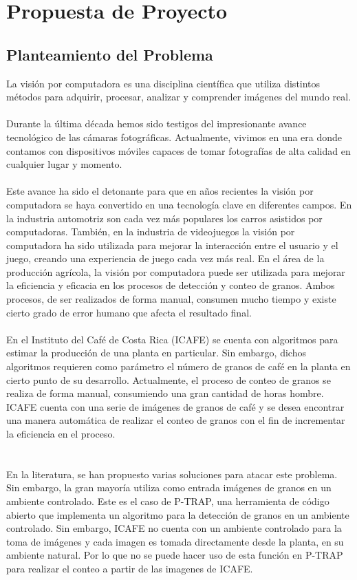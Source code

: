 \section{\textbf{Propuesta de Proyecto}}
\subsection{Planteamiento del Problema}
La visi\'on por computadora es una disciplina cient\'ifica que utiliza distintos m\'etodos para adquirir, procesar, analizar y comprender im\'agenes del mundo real. 
\\\\
Durante la \'ultima d\'ecada hemos sido testigos del impresionante avance tecnol\'ogico de las c\'amaras fotogr\'aficas. Actualmente, vivimos en una era donde contamos con dispositivos m\'oviles capaces de tomar fotograf\'ias de alta calidad en cualquier lugar y momento. 
\\\\
Este avance ha sido el detonante para que en a\~nos recientes la visi\'on por computadora se haya convertido en una tecnolog\'ia clave en diferentes campos. En la industria automotriz son cada vez m\'as populares los carros asistidos por computadoras. Tambi\'en, en la industria de videojuegos la visi\'on por computadora ha sido utilizada para mejorar la interacci\'on entre el usuario y el juego, creando una experiencia de juego cada vez m\'as real. En el \'area de la producci\'on agr\'icola, la visi\'on por computadora puede ser utilizada para mejorar la eficiencia y eficacia en los procesos de detecci\'on y conteo de granos. Ambos procesos, de ser realizados de forma manual, consumen mucho tiempo y existe cierto grado de error humano que afecta el resultado final.
\\\\
En el Instituto del Caf\'e de Costa Rica (ICAFE) se cuenta con algoritmos para estimar la producci\'on de una planta en particular. Sin embargo, dichos algoritmos requieren como par\'ametro el n\'umero de granos de caf\'e en la planta en cierto punto de su desarrollo. Actualmente, el proceso de conteo de granos se realiza de forma manual, consumiendo una gran cantidad de horas hombre. ICAFE cuenta con una serie de im\'agenes de granos de caf\'e y se desea encontrar una manera autom\'atica de realizar el conteo de granos con el fin de incrementar la eficiencia en el proceso.
\\\\\\
En la literatura, se han propuesto varias soluciones para atacar este problema. Sin embargo, la gran mayor\'ia utiliza como entrada im\'agenes de granos en un ambiente controlado. Este es el caso de P-TRAP, una herramienta de c\'odigo abierto que implementa un algoritmo para la detecci\'on de granos en un ambiente controlado. Sin embargo, ICAFE no cuenta con un ambiente controlado para la toma de im\'agenes y cada imagen es tomada directamente desde la planta, en su ambiente natural. Por lo que no se puede hacer uso de esta funci\'on en P-TRAP para realizar el conteo a partir de las imagenes de ICAFE.
